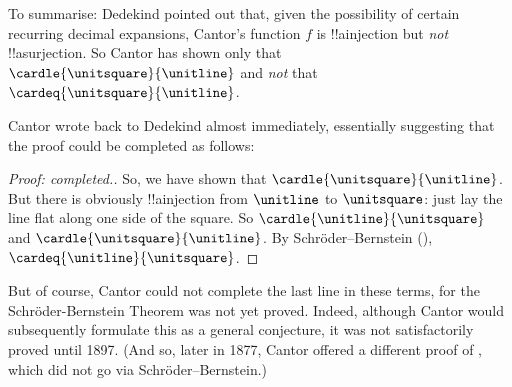 \documentclass[../../../include/open-logic-section]{subfiles}
\begin{document}
To summarise: Dedekind pointed out that, given the possibility of
certain recurring decimal expansions, Cantor's function $f$ is
!!a{injection} but \emph{not} !!a{surjection}. So Cantor has shown
only that $\cardle{\unitsquare}{\unitline}$ and \emph{not} that
$\cardeq{\unitsquare}{\unitline}$. 

Cantor wrote back to Dedekind almost immediately, essentially
suggesting that the proof could be completed as follows:

\begin{proof}[Proof: completed.] 
So, we have shown that $\cardle{\unitsquare}{\unitline}$. But there is
obviously !!a{injection} from $\unitline$ to $\unitsquare$: just lay
the line flat along one side of the square. So
$\cardle{\unitline}{\unitsquare}$ and
$\cardle{\unitsquare}{\unitline}$. By Schr\"{o}der--Bernstein
(),
$\cardeq{\unitline}{\unitsquare}$.
\end{proof}

But of course, Cantor could not complete the last line in these terms,
for the Schr\"{o}der-Bernstein Theorem was not yet proved. Indeed,
although Cantor would subsequently formulate this as a general
conjecture, it was not satisfactorily proved until 1897. (And so,
later in 1877, Cantor offered a different proof of
, which did not go via
Schr\"{o}der--Bernstein.)
\end{document}
